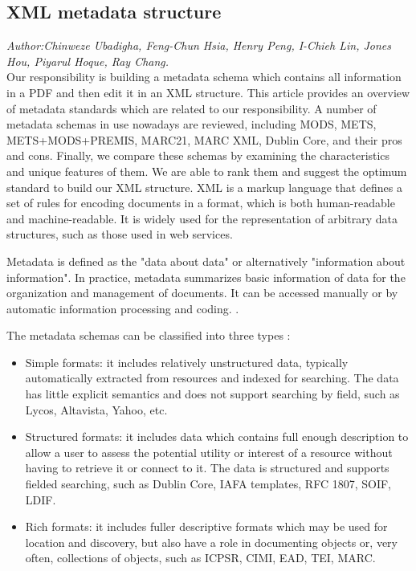 \subsection{XML metadata structure}
\textit{\footnotesize Author:Chinweze Ubadigha, Feng-Chun Hsia, Henry Peng, I-Chieh Lin, Jones Hou, Piyarul Hoque, Ray Chang.}\\

Our responsibility is building a metadata schema which contains all information in a PDF and then edit it in an XML structure. This article provides an overview of metadata standards which are related to our responsibility. A number of metadata schemas in use nowadays are reviewed, including MODS, METS, METS+MODS+PREMIS, MARC21, MARC XML, Dublin Core, and  their pros and cons. Finally, we compare these schemas by examining the characteristics and unique features of them. We are able to rank them and suggest the optimum standard to build our XML structure. XML is a markup language that defines a set of rules for encoding documents in a format,  which is both human-readable and machine-readable. It is widely used for the representation of arbitrary data structures, such as those used in web services.

Metadata is defined as the "data about data" or alternatively "information about information". In practice, metadata summarizes basic information of data for the organization and management of documents. It can be accessed manually or by automatic information processing and coding. \cite{underwood2003}.

The metadata schemas can be classified into three types \cite{Dempsey2015}:
\begin{itemize}
	\item Simple formats: it includes relatively unstructured data, typically automatically extracted from resources and indexed for searching. The data has little explicit semantics and does not support searching by field, such as Lycos, Altavista, Yahoo, etc.
	\item Structured formats: it includes data which contains full enough description to allow a user to assess the potential utility or interest of a resource without having to retrieve it or connect to it. The data is structured and supports fielded searching, such as Dublin Core, IAFA templates, RFC 1807, SOIF, LDIF.
	\item Rich formats: it includes fuller descriptive formats which may be used for location and discovery, but also have a role in documenting objects or, very often, collections of objects, such as ICPSR, CIMI, EAD, TEI, MARC.
\end{itemize}


